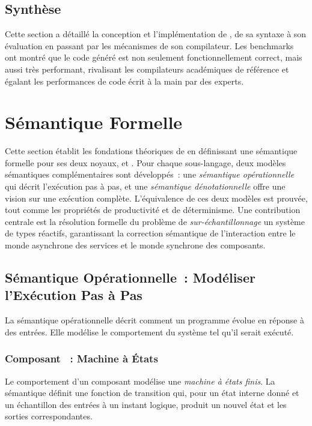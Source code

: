 \subsection{Synthèse}

Cette section a détaillé la conception et l'implémentation de \GRust, de sa syntaxe à son évaluation
en passant par les mécanismes de son compilateur. Les benchmarks ont montré que le code généré est
non seulement fonctionnellement correct, mais aussi très performant, rivalisant les compilateurs
académiques de référence et égalant les performances de code \Rust écrit à la main par des experts.

\section{Sémantique Formelle}

Cette section établit les fondations théoriques de \GRust en définissant une sémantique formelle
pour ses deux noyaux, \GRSync et \GRFRP. Pour chaque sous-langage, deux modèles sémantiques
complémentaires sont développés~: une \emph{sémantique opérationnelle} qui décrit l'exécution pas à
pas, et une \emph{sémantique dénotationnelle} offre une vision sur une exécution complète.
L'équivalence de ces deux modèles est prouvée, tout comme les propriétés de productivité et de
déterminisme. Une contribution centrale est la résolution formelle du problème de
\emph{sur-échantillonnage} \via un système de types réactifs, garantissant la correction sémantique
de l'interaction entre le monde asynchrone des services et le monde synchrone des composants.

\subsection{Sémantique Opérationnelle~: Modéliser l'Exécution Pas à Pas}

La sémantique opérationnelle décrit comment un programme \GRust évolue en réponse à des entrées.
Elle modélise le comportement du système tel qu'il serait exécuté.

\subsubsection{Composant \GRSync~: Machine à États}

Le comportement d'un composant \GRSync modélise une \emph{machine à états finis}. La sémantique
définit une fonction de transition qui, pour un état interne donné et un échantillon des entrées à
un instant logique, produit un nouvel état et les sorties correspondantes.

